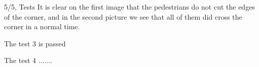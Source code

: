 \documentclass[10pt,a4paper]{article}
\begin{document}
\begin{task}{5/5, Tests}
It is clear on the first image that the pedestrians do not cut the edges of the corner, and in the second picture we see that all of them did cross the corner in a normal time. \newline \newline

The test 3 is passed


 \vfill\eject

The test 4 .......

\end{task}




\end{document}
